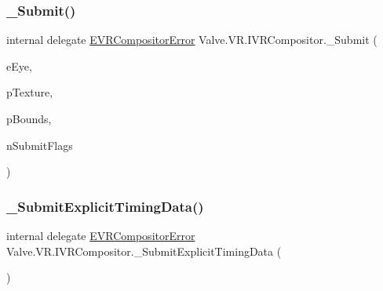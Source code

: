 \subsubsection{\texorpdfstring{\_Submit()}{\_Submit()}}
{\footnotesize\ttfamily internal delegate \mbox{\hyperlink{namespace_valve_1_1_v_r_ac34ee1034fda668ccd45f57676ded81b}{E\+V\+R\+Compositor\+Error}} Valve.\+V\+R.\+I\+V\+R\+Compositor.\+\_\+\+Submit (\begin{DoxyParamCaption}\item[{\mbox{\hyperlink{namespace_valve_1_1_v_r_a8153d4a3e627e1cede046327087c1880}{E\+V\+R\+Eye}}}]{e\+Eye,  }\item[{ref \mbox{\hyperlink{struct_valve_1_1_v_r_1_1_texture__t}{Texture\+\_\+t}}}]{p\+Texture,  }\item[{ref \mbox{\hyperlink{struct_valve_1_1_v_r_1_1_v_r_texture_bounds__t}{V\+R\+Texture\+Bounds\+\_\+t}}}]{p\+Bounds,  }\item[{\mbox{\hyperlink{namespace_valve_1_1_v_r_ad103abad1c8abaa4b384eccf2605265f}{E\+V\+R\+Submit\+Flags}}}]{n\+Submit\+Flags }\end{DoxyParamCaption})}

\mbox{\label{struct_valve_1_1_v_r_1_1_i_v_r_compositor_a5db66fc4dafe46e41c5cf85bf8d1c719}} 
\subsubsection{\texorpdfstring{\_SubmitExplicitTimingData()}{\_SubmitExplicitTimingData()}}
{\footnotesize\ttfamily internal delegate \mbox{\hyperlink{namespace_valve_1_1_v_r_ac34ee1034fda668ccd45f57676ded81b}{E\+V\+R\+Compositor\+Error}} Valve.\+V\+R.\+I\+V\+R\+Compositor.\+\_\+\+Submit\+Explicit\+Timing\+Data (\begin{DoxyParamCaption}{ }\end{DoxyParamCaption})}

\mbox{\label{struct_valve_1_1_v_r_1_1_i_v_r_compositor_a52c4de7b702770e872b7ef001d8c6b32}} 
